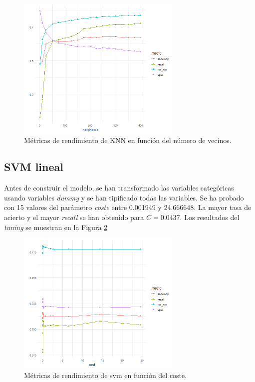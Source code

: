 \documentclass[12pt,a4paper,]{book}
\newcounter{dummy}
\numberwithin{dummy}{section}
\theoremstyle{ocrenumbox}
\theoremstyle{blacknumex}
\theoremstyle{blacknumbox}
\theoremstyle{ocrenum}
\theoremstyle{ocrenum}
\begin{document}
\begin{figure}[h!]
\centering
\includegraphics[width =0.7\textwidth]{graficos/knn_tuningplot.png}
\caption{Métricas de rendimiento de KNN en función del número de vecinos.}
\label{fig:knn_tuningplot}
\end{figure}

\hypertarget{svm-lineal}{%
\subsection{SVM lineal}\label{svm-lineal}}

Antes de construir el modelo, se han transformado las variables
categóricas usando variables \emph{dummy} y se han tipificado todas las
variables. Se ha probado con 15 valores del parámetro \emph{coste} entre
0.001949 y 24.666648. La mayor tasa de acierto y el mayor \emph{recall}
se han obtenido para \(C = 0.0437\). Los resultados del \emph{tuning} se
muestran en la Figura \ref{fig:svm_tuningplot}

\begin{figure}[h!]
\centering
\includegraphics[width =0.7\textwidth]{graficos/svm_tuningplot.png}
\caption{Métricas de rendimiento de svm en función del coste.}
\label{fig:svm_tuningplot}
\end{figure}
\end{document}
